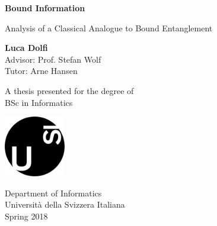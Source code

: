 \begin{titlepage}
    \begin{center}
        \vspace*{1cm}
        
        \Huge
        \textbf{Bound Information}
        
        \vspace{0.5cm}
        \LARGE
        {Analysis of a Classical Analogue to Bound Entanglement}
        
        \vspace{1.5cm}
        
        \textbf{Luca Dolfi}\\ 
         Advisor: Prof. Stefan Wolf \\ 
         Tutor: Arne Hansen \\
        
        \vfill
        
        A thesis presented for the degree of\\
        BSc in Informatics
        
        \vspace{0.8cm}
        
        \includegraphics[width=0.2\textwidth]{images/usi-immagini-logo-formatted.png}
        
        \Large
        Department of Informatics\\
        Universit\`a della Svizzera Italiana\\
        Spring 2018
        
    \end{center}
\end{titlepage}